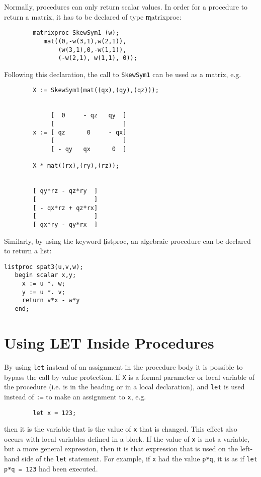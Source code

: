 Normally, procedures can only return scalar values. In order for a procedure to
return a matrix, it has to be declared of 
type \k{matrixproc}:
\begin{verbatim}
        matrixproc SkewSym1 (w);
           mat((0,-w(3,1),w(2,1)),
               (w(3,1),0,-w(1,1)),
               (-w(2,1), w(1,1), 0));
\end{verbatim}
Following this declaration, the call to \texttt{SkewSym1} can be used as a matrix, e.g.
\begin{verbatim}
        X := SkewSym1(mat((qx),(qy),(qz)));


             [  0     - qz   qy  ]
             [                   ]
        x := [ qz      0     - qx]
             [                   ]
             [ - qy   qx      0  ]

        X * mat((rx),(ry),(rz));


        [ qy*rz - qz*ry  ]
        [                ]
        [ - qx*rz + qz*rx]
        [                ]
        [ qx*ry - qy*rx  ]
\end{verbatim}
\hypertarget{reserved:LISTPROC}{}
Similarly, by using the keyword \k{listproc}, an algebraic
procedure can be declared to return a list:
\begin{verbatim}
listproc spat3(u,v,w);
   begin scalar x,y;
     x := u *. w;
     y := u *. v;
     return v*x - w*y
   end;
\end{verbatim}


\section{Using LET Inside Procedures}

By using \texttt{let} instead of an assignment in the procedure
body it is possible to bypass the call-by-value
 protection.  If \texttt{X} is a formal parameter or local
variable of the procedure (i.e. is in the heading or in a local
declaration), and \texttt{let} is used instead of \texttt{:=} to make an
assignment to \texttt{x}, e.g.

\begin{verbatim}
        let x = 123;
\end{verbatim}
then it is the variable that is the value of \texttt{x} that is changed.
This effect also occurs with local variables defined in a block.  If the
value of \texttt{x} is not a variable, but a more general expression, then it
is that expression that is used on the left-hand side of the \texttt{let}
statement.  For example, if \texttt{x} had the value \texttt{p*q}, it is as if
\texttt{let p*q = 123} had been executed.

